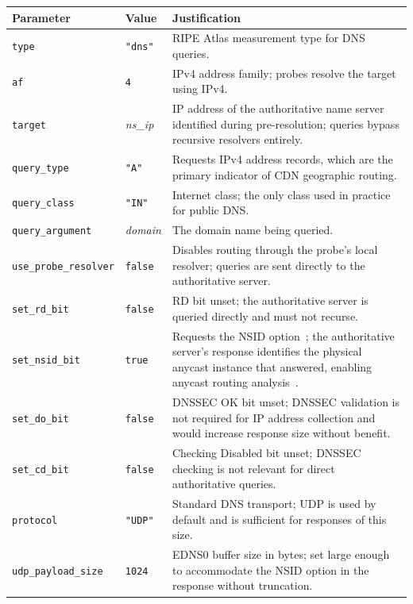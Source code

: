 \begin{table}[H]
\centering
\small
\begin{tabularx}{\linewidth}{l l X}
\toprule
\textbf{Parameter} & \textbf{Value} & \textbf{Justification} \\
\midrule
\texttt{type} & \texttt{"dns"} & RIPE Atlas measurement type for \ac{DNS} queries. \\
\texttt{af} & \texttt{4} & \ac{IPv4} address family; probes resolve the target using \ac{IPv4}. \\
\texttt{target} & \textit{ns\_ip} & \ac{IP} address of the authoritative name server identified during pre-resolution; queries bypass recursive resolvers entirely. \\
\texttt{query\_type} & \texttt{"A"} & Requests \ac{IPv4} address records, which are the primary indicator of \ac{CDN} geographic routing. \\
\texttt{query\_class} & \texttt{"IN"} & Internet class; the only class used in practice for public \ac{DNS}. \\
\texttt{query\_argument} & \textit{domain} & The domain name being queried. \\
\texttt{use\_probe\_resolver} & \texttt{false} & Disables routing through the probe's local resolver; queries are sent directly to the authoritative server. \\
\texttt{set\_rd\_bit} & \texttt{false} & \ac{RD} bit unset; the authoritative server is queried directly and must not recurse. \\
\texttt{set\_nsid\_bit} & \texttt{true} & Requests the \ac{NSID} option~\cite{RFC5001}; the authoritative server's response identifies the physical anycast instance that answered, enabling anycast routing analysis~\cite{Bortzmeyer2013,Finnegan2018}. \\
\texttt{set\_do\_bit} & \texttt{false} & \ac{DNSSEC} OK bit unset; \ac{DNSSEC} validation is not required for \ac{IP} address collection and would increase response size without benefit. \\
\texttt{set\_cd\_bit} & \texttt{false} & Checking Disabled bit unset; \ac{DNSSEC} checking is not relevant for direct authoritative queries. \\
\texttt{protocol} & \texttt{"UDP"} & Standard \ac{DNS} transport; \ac{UDP} is used by default and is sufficient for responses of this size. \\
\texttt{udp\_payload\_size} & \texttt{1024} & EDNS0 buffer size in bytes; set large enough to accommodate the \ac{NSID} option in the response without truncation. \\

\end{tabularx}
\end{table}
